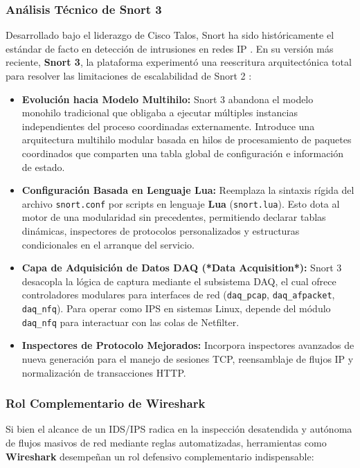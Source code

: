 \subsubsection{Análisis Técnico de Snort 3}

Desarrollado bajo el liderazgo de Cisco Talos, Snort ha sido históricamente el estándar de facto en detección de intrusiones en redes IP \citep{caswell_snort_2007}. En su versión más reciente, \textbf{Snort 3}, la plataforma experimentó una reescritura arquitectónica total para resolver las limitaciones de escalabilidad de Snort 2 \citep{cisco_snort3_2024}:

\begin{itemize}
  \item \textbf{Evolución hacia Modelo Multihilo:} Snort 3 abandona el modelo monohilo tradicional que obligaba a ejecutar múltiples instancias independientes del proceso coordinadas externamente. Introduce una arquitectura multihilo modular basada en hilos de procesamiento de paquetes coordinados que comparten una tabla global de configuración e información de estado.
  \item \textbf{Configuración Basada en Lenguaje Lua:} Reemplaza la sintaxis rígida del archivo \texttt{snort.conf} por scripts en lenguaje \textbf{Lua} (\texttt{snort.lua}). Esto dota al motor de una modularidad sin precedentes, permitiendo declarar tablas dinámicas, inspectores de protocolos personalizados y estructuras condicionales en el arranque del servicio.
  \item \textbf{Capa de Adquisición de Datos DAQ (*Data Acquisition*):} Snort 3 desacopla la lógica de captura mediante el subsistema DAQ, el cual ofrece controladores modulares para interfaces de red (\texttt{daq\_pcap}, \texttt{daq\_afpacket}, \texttt{daq\_nfq}). Para operar como IPS en sistemas Linux, depende del módulo \texttt{daq\_nfq} para interactuar con las colas de Netfilter.
  \item \textbf{Inspectores de Protocolo Mejorados:} Incorpora inspectores avanzados de nueva generación para el manejo de sesiones TCP, reensamblaje de flujos IP y normalización de transacciones HTTP.
\end{itemize}

\subsubsection{Rol Complementario de Wireshark}

Si bien el alcance de un IDS/IPS radica en la inspección desatendida y autónoma de flujos masivos de red mediante reglas automatizadas, herramientas como \textbf{Wireshark} \citep{combs_wireshark_2020} desempeñan un rol defensivo complementario indispensable:

